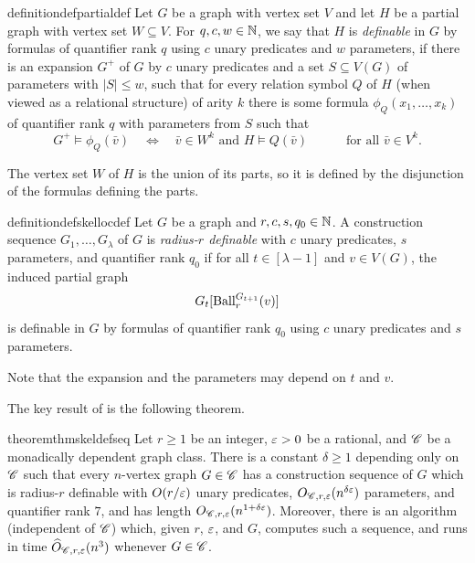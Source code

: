 \begin{restatable}{definition}{defpartialdef}\label{def:partial-definable}
Let $G$ be a graph with vertex set $V$ and let $H$ be a partial graph with vertex set $W\subseteq V$.
For $q,c,w\in \mathbb N$,
we say that $H$ is \emph{definable} in $G$  by formulas of quantifier rank $q$ using $c$ unary predicates and $w$ parameters, if
there is an expansion $G^+$ of $G$ by $c$ unary predicates
and a set $S\subseteq V(G)$ of parameters with $|S|\le w$,
such that for every relation symbol $Q$ of $H$ (when viewed as a relational structure) of arity $k$ there is some formula $\phi_Q(x_1,\ldots,x_k)$ of quantifier rank $q$ with parameters from $S$
such that
$$G^+\models\phi_Q(\bar v)\quad\iff\quad \bar v\in W^k\text{ and }H\models Q(\bar v)\qquad\quad\text{for all $\bar v\in V^k$.}$$
\end{restatable}

The vertex set $W$ of $H$ is the union of its parts, so it is defined by the disjunction of the formulas defining the parts.

\begin{restatable}{definition}{defskellocdef}\label{def:skel-loc-def}
  Let $G$ be a graph and $r,c,s,q_0\in\mathbb N$.
  A construction sequence $G_1,\ldots,G_\lambda$ of $G$ is \emph{radius-$r$ definable} with $c$ unary predicates, $s$ parameters, and quantifier rank $q_0$
  if for all $t\in[\lambda-1]$ and $v\in V(G)$, the induced partial graph
  \[
      G_t[\operatorname{Ball}^{G_{t+1}}_r(v)]
  \]
  is definable in $G$ by formulas of quantifier rank $q_0$ using $c$ unary predicates and $s$ parameters.
\end{restatable}

\noindent Note that the expansion and the parameters may depend on $t$ and $v$.

\medskip

The key result of  is the following theorem.
\begin{restatable}{theorem}{thmskeldefseq}\label{thm:skel-def-seq}
  Let $r\ge 1$ be an integer, $\varepsilon>0$ be a rational, and $\mathscr C$ be a monadically dependent graph class. There is a constant $\delta\ge1$ depending only on $\mathscr C$ such that every $n$-vertex graph $G\in\mathscr C$
  has a construction sequence of $G$ which is radius-$r$ definable with $O(r/\varepsilon)$ unary predicates, $O_{\mathscr C,r,\varepsilon}(n^{\delta\varepsilon})$ parameters, and quantifier rank $7$, and has length $O_{\mathscr C,r,\varepsilon}(n^{1+\delta\varepsilon})$. Moreover, there is an algorithm (independent of $\mathscr C$)
  which, given $r$, $\varepsilon$, and $G$, computes such a sequence, and runs in time $\widehat O_{\mathscr C,r,\varepsilon}(n^3)$ whenever $G\in\mathscr C$.
\end{restatable}



